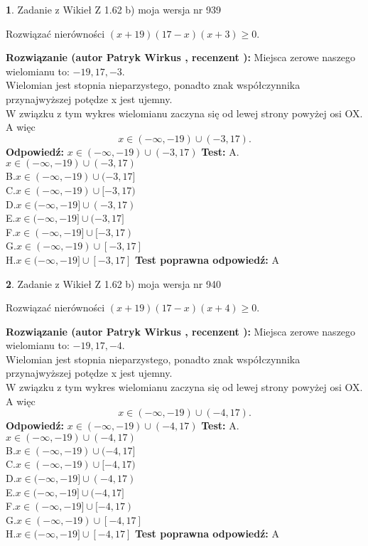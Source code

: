 \documentclass[12pt, a4paper]{article}
\theoremstyle{definition} %
\newtheorem{zad}{}
\newcommand{\zadStart}[1]{\begin{zad}#1\newline}
\newcommand{\zadStop}{\end{zad}}
\newcommand{\rozwStart}[2]{\noindent \textbf{Rozwiązanie (autor #1 , recenzent #2): }\newline}
\newcommand{\rozwStop}{\newline}
\newcommand{\odpStart}{\noindent \textbf{Odpowiedź:}\newline}
\newcommand{\odpStop}{\newline}
\newcommand{\testStart}{\noindent \textbf{Test:}\newline}
\newcommand{\testStop}{\newline}
\newcommand{\kluczStart}{\noindent \textbf{Test poprawna odpowiedź:}\newline}
\newcommand{\kluczStop}{\newline}
\begin{document}
\zadStart{Zadanie z Wikieł Z 1.62 b) moja wersja nr 939}

Rozwiązać nierówności $(x+19)(17-x)(x+3)\ge0$.
\zadStop
\rozwStart{Patryk Wirkus}{}
Miejsca zerowe naszego wielomianu to: $-19, 17, -3$.\\
Wielomian jest stopnia nieparzystego, ponadto znak współczynnika przy\linebreak najwyższej potędze x jest ujemny.\\ W związku z tym wykres wielomianu zaczyna się od lewej strony powyżej osi OX. A więc $$x \in (-\infty,-19) \cup (-3,17).$$
\rozwStop
\odpStart
$x \in (-\infty,-19) \cup (-3,17)$
\odpStop
\testStart
A.$x \in (-\infty,-19) \cup (-3,17)$\\
B.$x \in (-\infty,-19) \cup (-3,17]$\\
C.$x \in (-\infty,-19) \cup [-3,17)$\\
D.$x \in (-\infty,-19] \cup (-3,17)$\\
E.$x \in (-\infty,-19] \cup (-3,17]$\\
F.$x \in (-\infty,-19] \cup [-3,17)$\\
G.$x \in (-\infty,-19) \cup [-3,17]$\\
H.$x \in (-\infty,-19] \cup [-3,17]$
\testStop
\kluczStart
A
\kluczStop



\zadStart{Zadanie z Wikieł Z 1.62 b) moja wersja nr 940}

Rozwiązać nierówności $(x+19)(17-x)(x+4)\ge0$.
\zadStop
\rozwStart{Patryk Wirkus}{}
Miejsca zerowe naszego wielomianu to: $-19, 17, -4$.\\
Wielomian jest stopnia nieparzystego, ponadto znak współczynnika przy\linebreak najwyższej potędze x jest ujemny.\\ W związku z tym wykres wielomianu zaczyna się od lewej strony powyżej osi OX. A więc $$x \in (-\infty,-19) \cup (-4,17).$$
\rozwStop
\odpStart
$x \in (-\infty,-19) \cup (-4,17)$
\odpStop
\testStart
A.$x \in (-\infty,-19) \cup (-4,17)$\\
B.$x \in (-\infty,-19) \cup (-4,17]$\\
C.$x \in (-\infty,-19) \cup [-4,17)$\\
D.$x \in (-\infty,-19] \cup (-4,17)$\\
E.$x \in (-\infty,-19] \cup (-4,17]$\\
F.$x \in (-\infty,-19] \cup [-4,17)$\\
G.$x \in (-\infty,-19) \cup [-4,17]$\\
H.$x \in (-\infty,-19] \cup [-4,17]$
\testStop
\kluczStart
A
\kluczStop
\end{document}
